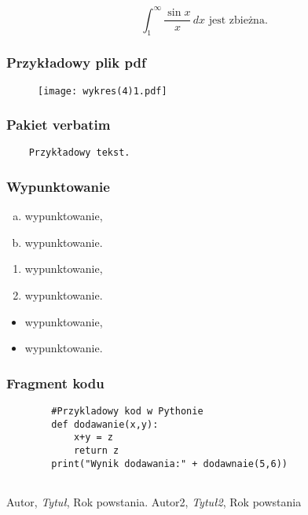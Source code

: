 \documentclass{article}
\theoremstyle{definition}
\begin{document}
	\[
	\int_1^{\infty} \frac{\sin x}{x} \, dx \text{ jest zbieżna.}
	\]


\subsubsection*{Przykładowy plik pdf}
\begin{figure}
	\centering
	\texttt{[image: wykres(4)1.pdf]}
	
\end{figure}
\subsubsection*{Pakiet verbatim}
\begin{verbatim}
	Przykładowy tekst. 
\end{verbatim}

\subsubsection*{Wypunktowanie}
\begin{enumerate}[a)]
	\item wypunktowanie,
	\item wypunktowanie.
\end{enumerate}

\begin{enumerate}
	\item wypunktowanie,
	\item wypunktowanie.
\end{enumerate}
\begin{itemize}
	\item wypunktowanie,
	\item wypunktowanie.
\end{itemize}



\subsubsection*{Fragment kodu}



	
	\begin{lstlisting}
		#Przykladowy kod w Pythonie
		def dodawanie(x,y):
			x+y = z
			return z
		print("Wynik dodawania:" + dodawnaie(5,6))
		
	\end{lstlisting}

\begin{thebibliography}{9}
	
	Autor, 
	\textit{Tytuł}, 
	Rok powstania.
	Autor2, 
	\textit{Tytuł2},
	Rok powstania

	
\end{thebibliography}
	
	
	
	
	
	
	
\end{document}
